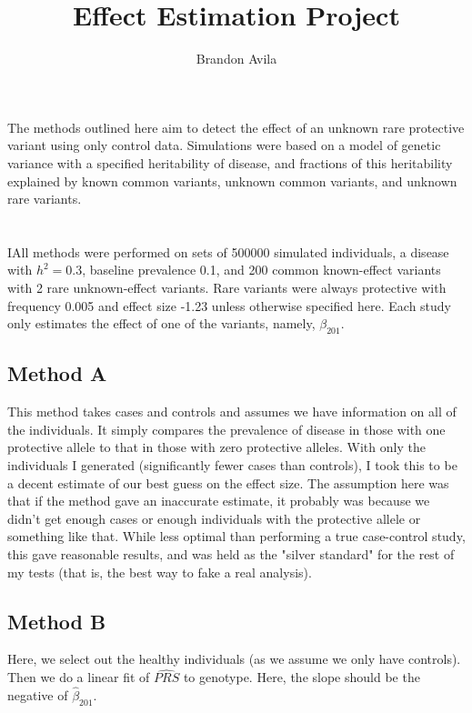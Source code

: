 \documentclass[11pt]{article} %
\title{Effect Estimation Project}
\author{Brandon Avila}
\begin{document}
\maketitle

\section{}
The methods outlined here aim to detect the effect of an unknown rare protective variant using only control data. Simulations were based on a model of genetic variance with a specified heritability of disease, and fractions of this heritability explained by known common variants, unknown common variants, and unknown rare variants.

\section{}
IAll methods were performed on sets of 500000 simulated individuals, a disease with $h^2 = 0.3$, baseline prevalence 0.1, and 200 common known-effect variants with 2 rare unknown-effect variants. Rare variants were always protective with frequency 0.005 and effect size -1.23 unless otherwise specified here. Each study only estimates the effect of one of the variants, namely, $\beta_{201}$.

\subsection{Method A}
This method takes cases and controls and assumes we have information on all of the individuals. It simply compares the prevalence of disease in those with one protective allele to that in those with zero protective alleles. With only the individuals I generated (significantly fewer cases than controls), I took this to be a decent estimate of our best guess on the effect size. The assumption here was that if the method gave an inaccurate estimate, it probably was because we didn't get enough cases or enough individuals with the protective allele or something like that. While less optimal than performing a true case-control study, this gave reasonable results, and was held as the "silver standard" for the rest of my tests (that is, the best way to fake a real analysis).

\subsection{Method B}
Here, we select out the healthy individuals (as we assume we only have controls). Then we do a linear fit of $\widehat{PRS}$ to genotype. Here, the slope should be the negative of $\hat{\beta}_{201}$.
\end{document}
